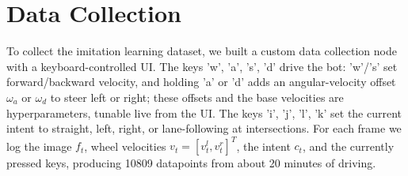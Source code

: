 \section{Data Collection}
\label{sec:datacollection}

To collect the imitation learning dataset, we built a custom data collection node with a keyboard-controlled UI. 
The keys 'w', 'a', 's', 'd' drive the bot: 'w'/'s' set forward/backward velocity, and holding 'a' or 'd' adds an angular-velocity offset $\omega_a$ or $\omega_d$ to steer left or right; 
these offsets and the base velocities are hyperparameters, tunable live from the UI. 
The keys 'i', 'j', 'l', 'k' set the current intent to straight, left, right, or lane-following at intersections. 
For each frame we log the image $f_t$, wheel velocities $v_t = [v_t^l, v_t^r]^T$, the intent $c_t$, and the currently pressed keys, producing 10809 datapoints from about 20 minutes of driving.